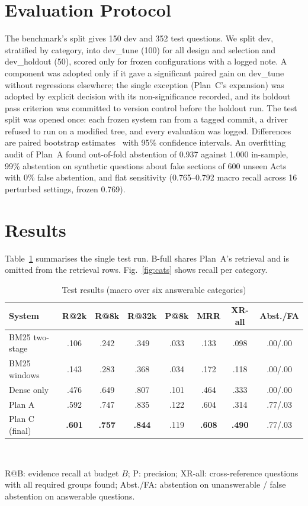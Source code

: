 \documentclass[conference]{IEEEtran}
\newcommand{\sig}[1]{\textbf{#1}}
\begin{document}
\section{Evaluation Protocol}

The benchmark's split gives 150 dev and 352 test questions. We split dev, stratified by category, into dev\_tune
(100) for all design and selection and dev\_holdout (50), scored only for frozen configurations with a logged
note. A component was adopted only if it gave a significant paired gain on dev\_tune without regressions elsewhere;
the single exception (Plan~C's expansion) was adopted by explicit decision with its non-significance recorded, and
its holdout pass criterion was committed to version control before the holdout run. The test split was opened
once: each frozen system ran from a tagged commit, a driver refused to run on a modified tree, and every
evaluation was logged. Differences are paired bootstrap estimates~\cite{efron1993bootstrap} with 95\% confidence
intervals. An overfitting audit of Plan~A found out-of-fold abstention of 0.937 against 1.000 in-sample, 99\%
abstention on synthetic questions about fake sections of 600 unseen Acts with 0\% false abstention, and flat
sensitivity (0.765--0.792 macro recall across 16 perturbed settings, frozen 0.769).

\section{Results}

Table~\ref{tab:main} summarises the single test run. B-full shares Plan~A's retrieval and is omitted from the
retrieval rows. Fig.~\ref{fig:cats} shows recall per category.

\begin{table}[t]
\caption{Test results (macro over six answerable categories)}
\label{tab:main}
\centering
\footnotesize
\setlength{\tabcolsep}{3pt}
\begin{tabular}{@{}lccccccc@{}}
\toprule
System & R@2k & R@8k & R@32k & P@8k & MRR & XR-all & Abst./FA \\
\midrule
BM25 two-stage & .106 & .242 & .349 & .033 & .133 & .098 & .00/.00 \\
BM25 windows & .143 & .283 & .368 & .034 & .172 & .118 & .00/.00 \\
Dense only & .476 & .649 & .807 & .101 & .464 & .333 & .00/.00 \\
Plan A & .592 & .747 & .835 & .122 & .604 & .314 & .77/.03 \\
Plan C (final) & \sig{.601} & \sig{.757} & \sig{.844} & .119 & \sig{.608} & \sig{.490} & .77/.03 \\
\bottomrule
\end{tabular}
\\[2pt]
\raggedright\scriptsize R@B: evidence recall at budget $B$; P: precision; XR-all: cross-reference questions with
all required groups found; Abst./FA: abstention on unanswerable / false abstention on answerable questions.
\end{table}
\end{document}
